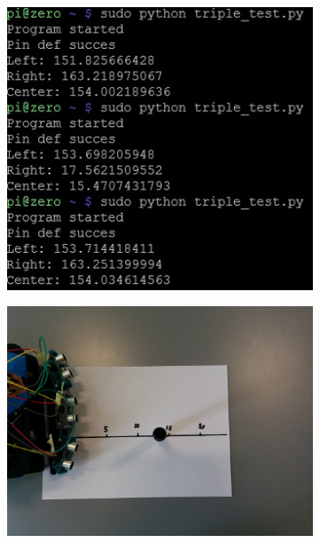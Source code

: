 \begin{figure}[H]
	\centering
	\begin{subfigure}[H]{0.3\textwidth}
		\includegraphics[width=\textwidth]{images/test-blindspotcmd.jpg}
	\end{subfigure}%
	\quad
	\begin{subfigure}[H]{0.3\textwidth}
		\includegraphics[width=\textwidth]{images/blindspot_test.jpg}
	\end{subfigure}%

\end{figure}
